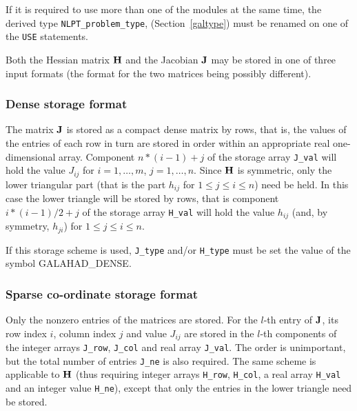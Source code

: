 \documentclass{galahad}
\newcommand{\sym}{\sf\small}
\begin{document}

\galhowto



\noindent
If it is required to use more than one of the modules at the same time, 
the derived type
{\tt NLPT\_problem\_type}, 
(Section~\ref{galtype})
must be renamed on one of the {\tt USE} statements.


\galmatrix
Both the Hessian matrix ${\mathbf{H}}$ and the Jacobian ${\mathbf{J}}$
may be stored in one of three input formats (the format for the two matrices
being possibly different).

\subsubsection{Dense storage format}\label{dense}

The matrix ${\mathbf{J}}$ is stored as a compact 
dense matrix by rows, that is, the values of the entries of each row in turn are
stored in order within an appropriate real one-dimensional array.
Component $n \ast (i-1) + j$ of the storage array {\tt J\_val} will hold the 
value $J_{ij}$ for $i = 1, \ldots , m$, $j = 1, \ldots , n$.
Since ${\mathbf{H}}$ is symmetric, only the lower triangular part (that is the part 
$h_{ij}$ for $1 \leq j \leq i \leq n$) need be held. In this case
the lower triangle will be stored by rows, that is 
component $i \ast (i-1)/2 + j$ of the storage array {\tt H\_val}  
will hold the value $h_{ij}$ (and, by symmetry, $h_{ji}$)
for $1 \leq j \leq i \leq n$.

\noindent
If this storage scheme is used, {\tt J\_type} and/or {\tt H\_type} must be set
the value of the symbol {\sym GALAHAD\_DENSE}.

\subsubsection{Sparse co-ordinate storage format}\label{coordinate}

Only the nonzero entries of the matrices are stored. For the 
$l$-th entry of ${\mathbf{J}}$, its row index $i$, column index $j$ 
and value $J_{ij}$
are stored in the $l$-th components of the integer arrays {\tt J\_row}, 
{\tt J\_col} and real array {\tt J\_val}. 
The order is unimportant, but the total
number of entries {\tt J\_ne} is also required. 
The same scheme is applicable to
${\mathbf{H}}$ (thus requiring integer arrays {\tt H\_row}, {\tt H\_col}, a real array 
{\tt H\_val} and an integer value {\tt H\_ne}),
except that only the entries in the lower triangle need be stored.
\end{document}
